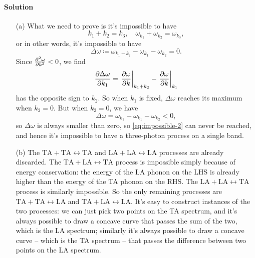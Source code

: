 \documentclass[hyperref, a4paper]{article}
\begin{document}
\paragraph{Solution} \begin{itemize}
\item[(a)] What we need to prove is it's impossible to have 
\begin{equation}
    k_1 + k_2 = k_3, \quad 
    \omega_{k_1} + \omega_{k_2} = \omega_{k_3},
\end{equation}
or in other words, it's impossible to have 
\begin{equation}
    \Delta \omega \coloneqq \omega_{k_1 + k_2} - \omega_{k_1} - \omega_{k_2} = 0.
    \label{eq:impossible-2}
\end{equation}
Since $\pdv[2]{\omega}{k} < 0$, we find  
\[
    \pdv{\Delta \omega}{k_1} = \eval{\pdv{\omega}{k}}_{k_1 + k_2} - \eval{\pdv{\omega}{k}}_{k_1}
\]
has the opposite sign to $k_2$. 
So when $k_1$ is fixed, $\Delta \omega$ reaches its maximum when $k_2 = 0$.
But when $k_2 = 0$, we have 
\[
    \Delta \omega = \omega_{k_1} - \omega_{k_1} - \omega_{k_2} < 0,
\]
so $\Delta \omega$ is always smaller than zero, so \eqref{eq:impossible-2} can never be reached,
and hence it's impossible to have a three-photon process on a single band.

\item[(b)] The $\mathrm{TA} + \mathrm{TA} \leftrightarrow \mathrm{TA}$ 
and $\mathrm{LA} + \mathrm{LA} \leftrightarrow \mathrm{LA}$ 
processes are already discarded.
The $\mathrm{TA} + \mathrm{LA} \leftrightarrow \mathrm{TA}$ process 
is impossible simply because of energy conservation:
the energy of the LA phonon on the LHS is already higher than the energy of the TA phonon on the RHS.
The $\mathrm{LA} + \mathrm{LA} \leftrightarrow \mathrm{TA}$ process 
is similarly impossible.
So the only remaining processes are $\mathrm{TA} + \mathrm{TA} \leftrightarrow \mathrm{LA}$
and $\mathrm{TA} + \mathrm{LA} \leftrightarrow \mathrm{LA}$.
It's easy to construct instances of the two processes:
we can just pick two points on the TA spectrum, 
and it's always possible to draw a concave curve that passes the sum of the two,
which is the LA spectrum;
similarly it's always possible to draw a concave curve -- which is the TA spectrum -- that passes the difference 
between two points on the LA spectrum.

\end{itemize}
\end{document}

